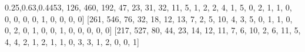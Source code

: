 \documentclass[
]{article}
\newenvironment{Shaded}{}{}
\newcommand{\DecValTok}[1]{\textcolor[rgb]{0.25,0.63,0.44}{#1}}
\newcommand{\NormalTok}[1]{#1}
\begin{document}
\begin{Shaded}
\begin{Highlighting}[]
\NormalTok{[}\DecValTok{53}\NormalTok{, }\DecValTok{126}\NormalTok{, }\DecValTok{460}\NormalTok{, }\DecValTok{192}\NormalTok{, }\DecValTok{47}\NormalTok{, }\DecValTok{23}\NormalTok{, }\DecValTok{31}\NormalTok{, }\DecValTok{32}\NormalTok{, }\DecValTok{11}\NormalTok{, }\DecValTok{5}\NormalTok{, }\DecValTok{1}\NormalTok{, }\DecValTok{2}\NormalTok{, }\DecValTok{2}\NormalTok{, }\DecValTok{4}\NormalTok{, }\DecValTok{1}\NormalTok{, }\DecValTok{5}\NormalTok{, }
\DecValTok{0}\NormalTok{, }\DecValTok{2}\NormalTok{, }\DecValTok{1}\NormalTok{, }\DecValTok{1}\NormalTok{, }\DecValTok{0}\NormalTok{, }\DecValTok{0}\NormalTok{, }\DecValTok{0}\NormalTok{, }\DecValTok{0}\NormalTok{, }\DecValTok{0}\NormalTok{, }\DecValTok{1}\NormalTok{, }\DecValTok{0}\NormalTok{, }\DecValTok{0}\NormalTok{, }\DecValTok{0}\NormalTok{, }\DecValTok{0}\NormalTok{]}
\NormalTok{[}\DecValTok{261}\NormalTok{, }\DecValTok{546}\NormalTok{, }\DecValTok{76}\NormalTok{, }\DecValTok{32}\NormalTok{, }\DecValTok{18}\NormalTok{, }\DecValTok{12}\NormalTok{, }\DecValTok{13}\NormalTok{, }\DecValTok{7}\NormalTok{, }\DecValTok{2}\NormalTok{, }\DecValTok{5}\NormalTok{, }\DecValTok{10}\NormalTok{, }\DecValTok{4}\NormalTok{, }\DecValTok{3}\NormalTok{, }\DecValTok{5}\NormalTok{, }\DecValTok{0}\NormalTok{, }
\DecValTok{1}\NormalTok{, }\DecValTok{1}\NormalTok{, }\DecValTok{0}\NormalTok{, }\DecValTok{0}\NormalTok{, }\DecValTok{2}\NormalTok{, }\DecValTok{0}\NormalTok{, }\DecValTok{1}\NormalTok{, }\DecValTok{0}\NormalTok{, }\DecValTok{0}\NormalTok{, }\DecValTok{1}\NormalTok{, }\DecValTok{0}\NormalTok{, }\DecValTok{0}\NormalTok{, }\DecValTok{0}\NormalTok{, }\DecValTok{0}\NormalTok{, }\DecValTok{0}\NormalTok{]}
\NormalTok{[}\DecValTok{217}\NormalTok{, }\DecValTok{527}\NormalTok{, }\DecValTok{80}\NormalTok{, }\DecValTok{44}\NormalTok{, }\DecValTok{23}\NormalTok{, }\DecValTok{14}\NormalTok{, }\DecValTok{12}\NormalTok{, }\DecValTok{11}\NormalTok{, }\DecValTok{7}\NormalTok{, }\DecValTok{6}\NormalTok{, }\DecValTok{10}\NormalTok{, }\DecValTok{2}\NormalTok{, }\DecValTok{6}\NormalTok{, }\DecValTok{11}\NormalTok{, }\DecValTok{5}\NormalTok{,}
\DecValTok{4}\NormalTok{, }\DecValTok{4}\NormalTok{, }\DecValTok{2}\NormalTok{, }\DecValTok{1}\NormalTok{, }\DecValTok{2}\NormalTok{, }\DecValTok{1}\NormalTok{, }\DecValTok{1}\NormalTok{, }\DecValTok{0}\NormalTok{, }\DecValTok{3}\NormalTok{, }\DecValTok{3}\NormalTok{, }\DecValTok{1}\NormalTok{, }\DecValTok{2}\NormalTok{, }\DecValTok{0}\NormalTok{, }\DecValTok{0}\NormalTok{, }\DecValTok{1}\NormalTok{]}
\end{Highlighting}
\end{Shaded}
\end{document}
